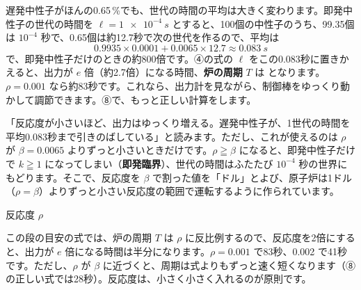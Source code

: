 遅発中性子がほんの0.65\,\%でも、世代の時間の平均は大きく変わります。即発中性子の世代の時間を $\ell=\qty{1e-4}{s}$ とすると、100個の中性子のうち、99.35個は $10^{-4}$ 秒で、0.65個は約12.7秒で次の世代を作るので、平均は
\[ 0.9935\times0.0001+0.0065\times12.7\approx\qty{0.083}{s} \]
で、即発中性子だけのときの約800倍です。④の式の $\ell$ をこの0.083秒に置きかえると、出力が $e$ 倍（約2.7倍）になる時間、\textbf{炉の周期} $T$ は
となります。$\rho=0.001$ なら約83秒です。これなら、出力計を見ながら、制御棒をゆっくり動かして調節できます。⑧で、もっと正しい計算をします。

\begin{phyomi}
「反応度が小さいほど、出力はゆっくり増える。遅発中性子が、1世代の時間を平均0.083秒まで引きのばしている」と読みます。ただし、これが使えるのは $\rho$ が $\beta=0.0065$ よりずっと小さいときだけです。$\rho\geqq\beta$ になると、即発中性子だけで $k\geqq1$ になってしまい（\textbf{即発臨界}）、世代の時間はふたたび $10^{-4}$ 秒の世界にもどります。そこで、反応度を $\beta$ で割った値を「ドル」とよび、原子炉は1ドル（$\rho=\beta$）よりずっと小さい反応度の範囲で運転するように作られています。
\end{phyomi}

\begin{phbaisuru}{反応度 $\rho$}
\noindent\begin{minipage}[c]{0.45\linewidth}\raggedright
この段の目安の式では、炉の周期 $T$ は $\rho$ に反比例するので、反応度を2倍にすると、出力が $e$ 倍になる時間は半分になります。$\rho=0.001$ で83秒、0.002 で41秒です。ただし、$\rho$ が $\beta$ に近づくと、周期は式よりもずっと速く短くなります（⑧の正しい式では28秒）。反応度は、小さく小さく入れるのが原則です。
\end{minipage}\hfill
\begin{minipage}[c]{0.52\linewidth}\centering
{}
\end{minipage}
\end{phbaisuru}

